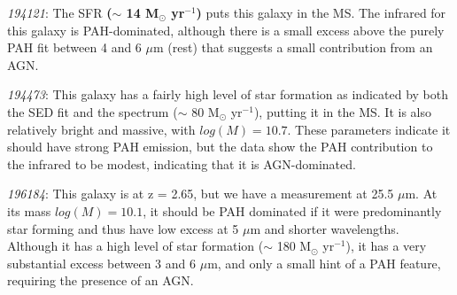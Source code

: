 \documentclass[twocolumn]{aastex63}
\begin{document}
{\it 194121}:
The SFR {\bf ($\sim$ 14 M$_\odot$ yr$^{-1}$)} puts this galaxy in the MS. The infrared for this galaxy is PAH-dominated, although there is a small excess above the purely PAH fit between 4 and 6 $\mu$m (rest) that suggests a small contribution from an AGN.  

{\it 194473}: This galaxy has a fairly high level of star formation as indicated by both the SED fit and the spectrum  ($\sim$ 80 M$_\odot$ yr$^{-1}$), putting it in the MS. It is also relatively bright and massive, with $log(M) = 10.7$. These parameters indicate it should have strong PAH emission, but the data show the PAH contribution to the infrared to be modest, indicating that it is AGN-dominated. 

{\it 196184}: This galaxy is at z = 2.65, but we have a measurement at 25.5 $\mu$m. At its mass $log(M) = 10.1$, it should be PAH dominated if it were predominantly star forming and thus have low excess at 5 $\mu$m and shorter wavelengths.  Although it has a high level of star formation ($\sim$ 180 M$_\odot$ yr$^{-1}$), it has a very substantial excess between 3 and 6 
$\mu$m, and only a small hint of a PAH feature, requiring  the presence of an AGN. 
\end{document}

